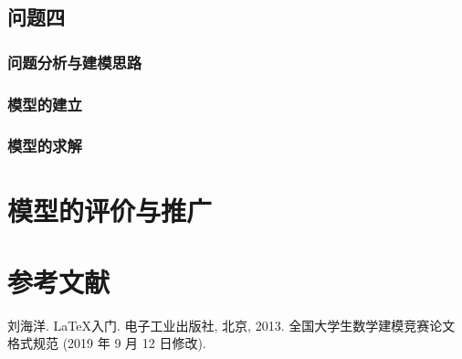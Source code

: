 \documentclass[withoutpreface,bwprint]{cumcmthesis} %
\begin{document}
\subsection{问题四}
	\subsubsection{问题分析与建模思路}


	\subsubsection{模型的建立}


	\subsubsection{模型的求解}

\section{模型的评价与推广}


\section{参考文献}

\begin{thebibliography}{9}%
    刘海洋.
    \newblock \LaTeX {}入门\allowbreak[J].
    \newblock 电子工业出版社, 北京, 2013.
    全国大学生数学建模竞赛论文格式规范 (2019 年 9 月 12 日修改).
\end{thebibliography}
\end{document}
